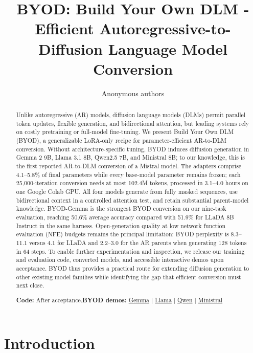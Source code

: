\documentclass{article}
\title{BYOD: Build Your Own DLM - Efficient Autoregressive-to-Diffusion Language Model Conversion}
\author{Anonymous authors}
\begin{document}
\maketitle

\begin{abstract}
Unlike autoregressive (AR) models, diffusion language models (DLMs) permit parallel token updates, flexible generation, and bidirectional attention, but leading systems rely on costly pretraining or full-model fine-tuning. We present Build Your Own DLM (BYOD), a generalizable LoRA-only recipe for parameter-efficient AR-to-DLM conversion. Without architecture-specific tuning, BYOD induces diffusion generation in Gemma 2 9B, Llama 3.1 8B, Qwen2.5 7B, and Ministral 8B; to our knowledge, this is the first reported AR-to-DLM conversion of a Mistral model. The adapters comprise 4.1--5.8\% of final parameters while every base-model parameter remains frozen; each 25,000-iteration conversion needs at most 102.4M tokens, processed in 3.1--4.0 hours on one Google Colab GPU. All four models generate from fully masked sequences, use bidirectional context in a controlled attention test, and retain substantial parent-model knowledge. BYOD-Gemma is the strongest BYOD conversion on our nine-task evaluation, reaching 50.6\% average accuracy compared with 51.9\% for LLaDA 8B Instruct in the same harness. Open-generation quality at low network function evaluation (NFE) budgets remains the principal limitation: BYOD perplexity is 8.3--11.1 versus 4.1 for LLaDA and 2.2--3.0 for the AR parents when generating 128 tokens in 64 steps. To enable further experimentation and inspection, we release our training and evaluation code, converted models, and accessible interactive demos upon acceptance. BYOD thus provides a practical route for extending diffusion generation to other existing model families while identifying the gap that efficient conversion must next close.

\noindent\textbf{Code:} After acceptance.\quad\textbf{BYOD demos:}
\href{https://huggingface.co/spaces/Dovelove/byod-gemma-2-9b}{Gemma} $\mid$
\href{https://huggingface.co/spaces/Dovelove/byod-llama-3.1-8b}{Llama} $\mid$
\href{https://huggingface.co/spaces/Dovelove/byod-qwen2.5-7b}{Qwen} $\mid$
\href{https://huggingface.co/spaces/Dovelove/byod-ministral-8b}{Ministral}
\end{abstract}

\section{Introduction}
\end{document}
